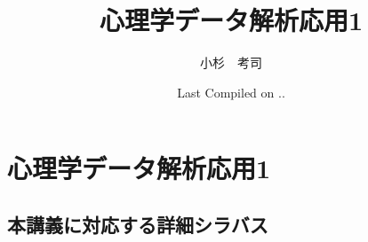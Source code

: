 \documentclass[dvipsnames]{ltjsbook}
\begin{document}


\VerbatimFootnotes
\title{心理学データ解析応用1}
\author{小杉　考司}
\date{Last Compiled on \number\year .\number\month .\number\day}
\maketitle
\setcounter{tocdepth}{1}



\tableofcontents

\linenumbers
\part{心理学データ解析応用1}















\appendix




\chapter{本講義に対応する詳細シラバス}















\nolinenumbers
% 
% 
\printbibliography[title=引用文献]

\printindex
\end{document}

